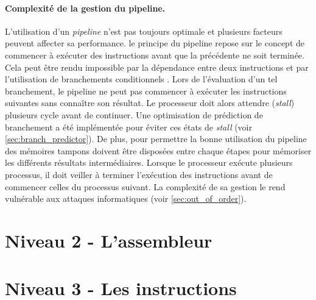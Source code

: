 \paragraph{Complexité de la gestion du pipeline.}
L'utilisation d'un \textit{pipeline} n'est pas toujours optimale et plusieurs facteurs peuvent affecter sa performance. le principe du pipeline repose sur le concept de commencer à exécuter des instructions avant que la précédente ne soit terminée. Cela peut être rendu impossible par la dépendance entre deux instructions et par l'utilisation de branchements conditionnels \cite{emma1987characterization}. Lors de l'évaluation d'un tel branchement, le pipeline ne peut pas commencer à exécuter les instructions suivantes sans connaître son résultat. Le processeur doit alors attendre (\textit{stall}) plusieurs cycle avant de continuer. Une optimisation de prédiction de branchement a été implémentée pour éviter ces états de \textit{stall} (voir \autoref{sec:branch_predictor}). De plus, pour permettre la bonne utilisation du pipeline des mémoires tampons doivent être disposées entre chaque étapes pour mémoriser les différents résultats intermédiaires. Lorsque le processeur exécute plusieurs processus, il doit veiller à terminer l'exécution des instructions avant de commencer celles du processus suivant. La complexité de sa gestion le rend vulnérable aux attaques informatiques (voir \autoref{sec:out_of_order}). 

\cite{emma1987characterization}


\section{Niveau 2 - L'assembleur}





\section{Niveau 3 - Les instructions}






